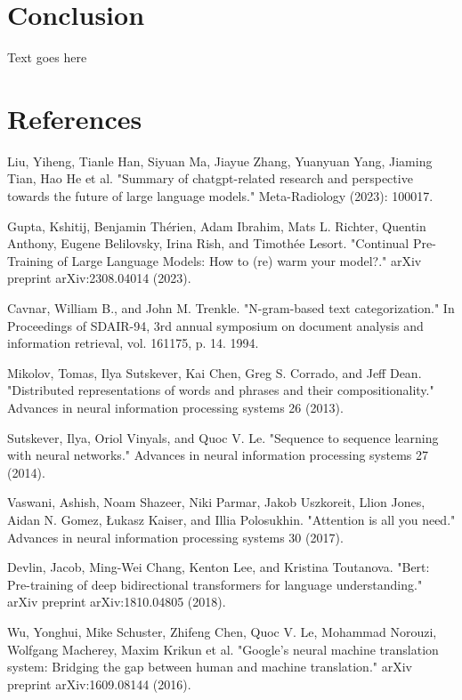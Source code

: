 \documentclass[t]{beamer}
\begin{document}
\section{Conclusion}
\begin{frame}{}
  Text goes here
\end{frame}

\section{References}
\begin{frame}{}
\begin{thebibliography}{}
  Liu, Yiheng, Tianle Han, Siyuan Ma, Jiayue Zhang, Yuanyuan Yang, Jiaming Tian, Hao He et al. "Summary of chatgpt-related research and perspective towards the future of large language models." Meta-Radiology (2023): 100017.

  Gupta, Kshitij, Benjamin Thérien, Adam Ibrahim, Mats L. Richter, Quentin Anthony, Eugene Belilovsky, Irina Rish, and Timothée Lesort. "Continual Pre-Training of Large Language Models: How to (re) warm your model?." arXiv preprint arXiv:2308.04014 (2023).

Cavnar, William B., and John M. Trenkle. "N-gram-based text categorization." In Proceedings of SDAIR-94, 3rd annual symposium on document analysis and information retrieval, vol. 161175, p. 14. 1994.

Mikolov, Tomas, Ilya Sutskever, Kai Chen, Greg S. Corrado, and Jeff Dean. "Distributed representations of words and phrases and their compositionality." Advances in neural information processing systems 26 (2013).


\end{thebibliography}
\end{frame}

\begin{frame}
  \begin{thebibliography}{}
Sutskever, Ilya, Oriol Vinyals, and Quoc V. Le. "Sequence to sequence learning with neural networks." Advances in neural information processing systems 27 (2014).

Vaswani, Ashish, Noam Shazeer, Niki Parmar, Jakob Uszkoreit, Llion Jones, Aidan N. Gomez, Łukasz Kaiser, and Illia Polosukhin. "Attention is all you need." Advances in neural information processing systems 30 (2017).

Devlin, Jacob, Ming-Wei Chang, Kenton Lee, and Kristina Toutanova. "Bert: Pre-training of deep bidirectional transformers for language understanding." arXiv preprint arXiv:1810.04805 (2018).

Wu, Yonghui, Mike Schuster, Zhifeng Chen, Quoc V. Le, Mohammad Norouzi, Wolfgang Macherey, Maxim Krikun et al. "Google's neural machine translation system: Bridging the gap between human and machine translation." arXiv preprint arXiv:1609.08144 (2016).
  \end{thebibliography}
\end{frame}
\end{document}
